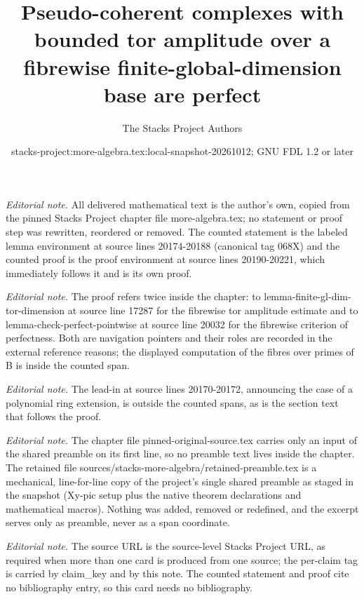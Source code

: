 \documentclass[10pt,a4paper]{amsart}
\title{Pseudo-coherent complexes with bounded tor amplitude over a fibrewise finite-global-dimension base are perfect}
\author{The Stacks Project Authors}
\date{stacks-project:more-algebra.tex:local-snapshot-20261012; GNU FDL 1.2 or later}
\theoremstyle{plain}
\theoremstyle{definition}
\theoremstyle{remark}
\numberwithin{equation}{subsection}
\begin{document}
\maketitle
\setcounter{subsection}{1}
\noindent\textit{Editorial note.} All delivered mathematical text is the author's own, copied from the pinned Stacks Project chapter file more-algebra.tex; no statement or proof step was rewritten, reordered or removed. The counted statement is the labeled lemma environment at source lines 20174-20188 (canonical tag 068X) and the counted proof is the proof environment at source lines 20190-20221, which immediately follows it and is its own proof.\par\medskip
\noindent\textit{Editorial note.} The proof refers twice inside the chapter: to lemma-finite-gl-dim-tor-dimension at source line 17287 for the fibrewise tor amplitude estimate and to lemma-check-perfect-pointwise at source line 20032 for the fibrewise criterion of perfectness. Both are navigation pointers and their roles are recorded in the external reference reasons; the displayed computation of the fibres over primes of B is inside the counted span.\par\medskip
\noindent\textit{Editorial note.} The lead-in at source lines 20170-20172, announcing the case of a polynomial ring extension, is outside the counted spans, as is the section text that follows the proof.\par\medskip
\noindent\textit{Editorial note.} The chapter file pinned-original-source.tex carries only an input of the shared preamble on its first line, so no preamble text lives inside the chapter. The retained file sources/stacks-more-algebra/retained-preamble.tex is a mechanical, line-for-line copy of the project's single shared preamble as staged in the snapshot (Xy-pic setup plus the native theorem declarations and mathematical macros). Nothing was added, removed or redefined, and the excerpt serves only as preamble, never as a span coordinate.\par\medskip
\noindent\textit{Editorial note.} The source URL is the source-level Stacks Project URL, as required when more than one card is produced from one source; the per-claim tag is carried by claim\_key and by this note. The counted statement and proof cite no bibliography entry, so this card needs no bibliography.\par\medskip
\end{document}
